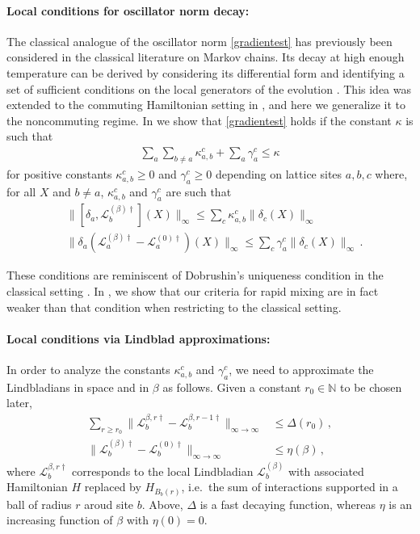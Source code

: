\documentclass[aps,pra,amsmath,amssymb,twocolumn,10pt]{revtex4-2}
\theoremstyle{definition}
\begin{document}
\paragraph{Local conditions for oscillator norm decay:} The classical analogue of the oscillator norm \eqref{gradientest} has previously been considered in the classical literature on Markov chains. Its decay at high enough temperature can be derived by considering its differential form and identifying a set of sufficient conditions on the local generators of the evolution \cite{Aizenman1987,stroock1992equivalence}. This idea was extended to the commuting Hamiltonian setting in \cite{Majewski1995,temme2015fast}, and here we generalize it to the noncommuting regime. In \cite{supplemental} we show that \eqref{gradientest} holds if the constant $\kappa$ is such that
\begin{align*}
\sum_a\sum_{b\ne a}\kappa_{a,b}^c+\sum_a \gamma_a^c\le \kappa 
\end{align*}
for positive constants $\kappa_{a,b}^c\ge 0$ and $\gamma^c_a\ge 0$ depending on lattice sites $a,b,c$ where, for all $X$ and $b\ne a$, $\kappa_{a,b}^c$ and $\gamma_a^c$ are such that
\begin{align}
&\|[\delta_a, \mathcal{L}_b^{(\beta)\dagger}](X)\|_\infty\le \sum_c \kappa^c_{a,b} \|\delta_c(X)\|_\infty\label{eq:11}\\
&\|\delta_a(\mathcal{L}_a^{(\beta)\dagger}-\mathcal{L}_a^{(0)\dagger})(X)\|_\infty\le \sum_c \gamma_a^c\|\delta_c(X)\|_\infty\,.\label{eq:22}
\end{align}

These conditions are reminiscent of Dobrushin's uniqueness condition in the classical setting \cite{dobrushin1970prescribing}. In \cite{supplemental}, we show that our criteria for rapid mixing are in fact weaker than that condition when restricting to the classical setting.

\paragraph{Local conditions via Lindblad approximations:} In order to analyze the constants  $\kappa_{a,b}^c$ and $\gamma_a^c$, we need to approximate the Lindbladians in space and in $\beta$ as follows. Given a constant $r_0\in\mathbb{N}$ to be chosen later,
\begin{align*}
\sum_{r\ge r_0}\|\mathcal{L}_b^{\beta,r\dagger}\!\!-\mathcal{L}_{b}^{\beta,r-1\dagger }\|_{\infty\to\infty}\!&\le \Delta(r_0)\,,\\
\|\mathcal{L}_b^{(\beta) \dagger}-\mathcal{L}_{b}^{(0) \dagger }\|_{\infty\to\infty}&\le \eta(\beta)\,,
\end{align*}
where $\mathcal{L}_b^{\beta,r\dagger}$ corresponds to the local Lindbladian $\mathcal{L}_b^{(\beta)}$ with associated Hamiltonian $H$ replaced by $H_{B_b(r)}$, i.e.~the sum of interactions supported in a ball of radius $r$ aroud site $b$. Above,
 $\Delta$ is a fast decaying function, whereas $\eta$ is an increasing function of $\beta$ with $\eta(0)=0$. 
 
\end{document}
